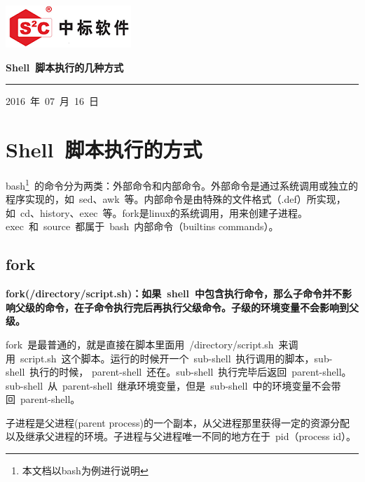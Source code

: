 \documentclass[a4paper]{ctexart}
\begin{document}
\thispagestyle{empty}

\noindent\begin{minipage}{\textwidth}
	\begin{flushleft}
	\includegraphics{logo/cs2c-short-logo}
	\end{flushleft}
\end{minipage}

\noindent\begin{minipage}{\textwidth}
\centering
{\LARGE \bfseries Shell~脚本执行的几种方式}
\noindent\rule[1.5ex]{\textwidth}{1pt}
\end{minipage}

\noindent\begin{center}
2016~年~07~月~16~日
\end{center}
\clearpage

\section{Shell~脚本执行的方式}
bash\footnote{本文档以bash为例进行说明}~的命令分为两类：外部命令和内部命令。外部命令是通过系统调用或独立的程序实现的，如~sed、awk~等。内部命令是由特殊的文件格式（.def）所实现，如~cd、history、exec~等。fork是linux的系统调用，用来创建子进程。exec~和~source~都属于~bash~内部命令（builtins commands）。
\subsection{fork}
\textbf
{fork(/directory/script.sh)：如果~shell~中包含执行命令，那么子命令并不影响父级的命令，在子命令执行完后再执行父级命令。子级的环境变量不会影响到父级。}

fork~是最普通的，就是直接在脚本里面用~/directory/script.sh~来调用~script.sh~这个脚本。运行的时候开一个~sub-shell~执行调用的脚本，sub-shell~执行的时候， parent-shell~还在。sub-shell~执行完毕后返回~parent-shell。 sub-shell~从~parent-shell~继承环境变量，但是~sub-shell~中的环境变量不会带回~parent-shell。

子进程是父进程(parent process)的一个副本，从父进程那里获得一定的资源分配以及继承父进程的环境。子进程与父进程唯一不同的地方在于~pid（process id）。
\end{document}
